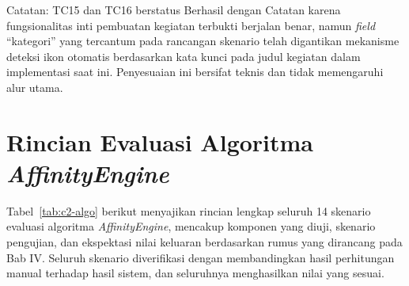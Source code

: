 Catatan: TC15 dan TC16 berstatus Berhasil dengan Catatan karena fungsionalitas inti pembuatan kegiatan terbukti berjalan benar, namun \emph{field} ``kategori'' yang tercantum pada rancangan skenario telah digantikan mekanisme deteksi ikon otomatis berdasarkan kata kunci pada judul kegiatan dalam implementasi saat ini. Penyesuaian ini bersifat teknis dan tidak memengaruhi alur utama.

\section{Rincian Evaluasi Algoritma \emph{AffinityEngine}}
\label{sec:c-evaluasi-algo}

Tabel~\ref{tab:c2-algo} berikut menyajikan rincian lengkap seluruh 14 skenario evaluasi algoritma \emph{AffinityEngine}, mencakup komponen yang diuji, skenario pengujian, dan ekspektasi nilai keluaran berdasarkan rumus yang dirancang pada Bab IV. Seluruh skenario diverifikasi dengan membandingkan hasil perhitungan manual terhadap hasil sistem, dan seluruhnya menghasilkan nilai yang sesuai.

